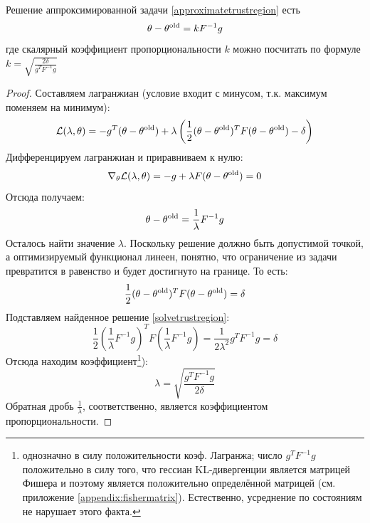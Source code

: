 \begin{theorem}
Решение аппроксимированной задачи \eqref{approximatetrustregion} есть
$$\theta - \theta^{\mathrm{old}} = kF^{-1}g$$
где скалярный коэффициент пропорциональности $k$ можно посчитать по формуле $k = \sqrt{\frac{2 \delta}{g^TF^{-1}g}}$
\begin{proof}
Составляем лагранжиан (условие входит с минусом, т.к. максимум поменяем на минимум):
$$\mathcal{L}(\lambda, \theta) = -g^T(\theta - \theta^{\mathrm{old}}) + \lambda \left( \frac{1}{2} (\theta - \theta^{\mathrm{old}})^T F (\theta - \theta^{\mathrm{old}}) - \delta \right)$$
Дифференцируем лагранжиан и приравниваем к нулю:
$$\nabla_\theta \mathcal{L}(\lambda, \theta) = -g + \lambda F (\theta - \theta^{\mathrm{old}}) = 0$$
Отсюда получаем:
\begin{equation}\label{solvetrustregion}
\theta - \theta^{\mathrm{old}} = \frac{1}{\lambda} F^{-1}g
\end{equation}
Осталось найти значение $\lambda$. Поскольку решение должно быть допустимой точкой, а оптимизируемый функционал линеен, понятно, что ограничение из задачи превратится в равенство и будет достигнуто на границе. То есть:
$$\frac{1}{2} (\theta - \theta^{\mathrm{old}})^T F (\theta - \theta^{\mathrm{old}}) = \delta$$
Подставляем найденное решение \eqref{solvetrustregion}:
$$\frac{1}{2} \left( \frac{1}{\lambda} F^{-1}g \right)^T F \left( \frac{1}{\lambda} F^{-1}g \right) = \frac{1}{2 \lambda^2} g^TF^{-1}g = \delta$$
Отсюда находим коэффициент\footnote{однозначно в силу положительности коэф. Лагранжа; число $g^TF^{-1}g$ положительно в силу того, что гессиан KL-дивергенции является матрицей Фишера и поэтому является положительно определённой матрицей (см. приложение \ref{appendix:fishermatrix}). Естественно, усреднение по состояниям не нарушает этого факта.}):
$$\lambda = \sqrt{\frac{g^TF^{-1}g}{2 \delta}}$$
Обратная дробь $\frac{1}{\lambda}$, соответственно, является коэффициентом пропорциональности.
\end{proof}
\end{theorem}

